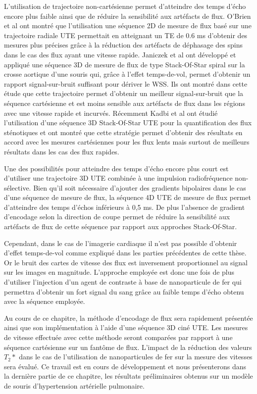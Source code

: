 L'utilisation de trajectoire non-cartésienne permet d'atteindre des temps d'écho encore plus faible ainsi que de réduire la sensibilité aux artéfacts de flux. O'Brien et al  \cite{OBrien:2009ul} ont montré que l'utilisation une séquence 2D de mesure de flux basé sur une trajectoire radiale UTE permettait en atteignant un TE de 0.6 ms d'obtenir des mesures plus précises grâce à la réduction des artéfacts de déphasage des spins dans le cas des flux ayant une vitesse rapide.  Janiczek et al \cite{Janiczek:2011qm} ont développé et appliqué une séquence 3D de mesure de flux de type Stack-Of-Star spiral sur la crosse aortique d'une souris qui, grâce à l'effet temps-de-vol, permet d'obtenir un rapport signal-sur-bruit suffisant pour dériver le WSS. Ils ont montré dans cette étude que cette trajectoire permet d'obtenir un meilleur signal-sur-bruit que la séquence cartésienne et est moins sensible aux artéfacts de flux dans les régions avec une vitesse rapide et incurvés. Récemment Kadbi et al \cite{Kadbi:2014uq} ont étudié l'utilisation d'une séquence 3D Stack-Of-Star UTE pour la quantification des flux sténotiques et ont montré que cette stratégie permet d'obtenir des résultats en accord avec les mesures cartésiennes pour les flux lents mais surtout de meilleurs résultats dans les cas des flux rapides.

Une des possibilités pour atteindre des temps d'écho encore plus court est d'utiliser une trajectoire 3D UTE combinée à une impulsion radiofréquence non-sélective. Bien qu'il soit nécessaire d'ajouter des gradients bipolaires dans le cas d'une séquence de mesure de flux, la séquence 4D UTE de mesure de flux permet d'atteindre des temps d'échos inférieurs à 0,5 ms. De plus l'absence de gradient d'encodage selon la direction de coupe permet de réduire la sensibilité aux artéfacts de flux de cette séquence par rapport aux approches Stack-Of-Star. 

Cependant, dans le cas de l'imagerie cardiaque il n'est pas possible d'obtenir d'effet temps-de-vol comme expliqué dans les parties précédentes de cette thèse. Or le bruit des cartes de vitesse des flux est inversement proportionnel au signal sur les images en magnitude. L'approche employée est donc une fois de plus d'utiliser l'injection d'un agent de contraste à base de nanoparticule de fer qui permettra d'obtenir un fort signal du sang grâce au faible temps d'écho obtenu avec la séquence employée.

Au cours de ce chapitre, la méthode d'encodage de flux sera rapidement présentée ainsi que son implémentation à l'aide d'une séquence 3D ciné UTE. Les mesures de vitesse effectuée avec cette méthode seront comparées par rapport à une séquence cartésienne sur un fantôme de flux. L'impact de la réduction des valeurs $T_2*$ dans le cas de l'utilisation de nanoparticules de fer sur la mesure des vitesses sera évalué. Ce travail est en cours de développement et nous présenterons dans la dernière partie de ce chapitre, les résultats préliminaires obtenus sur un modèle de souris d'hypertension artérielle pulmonaire.

